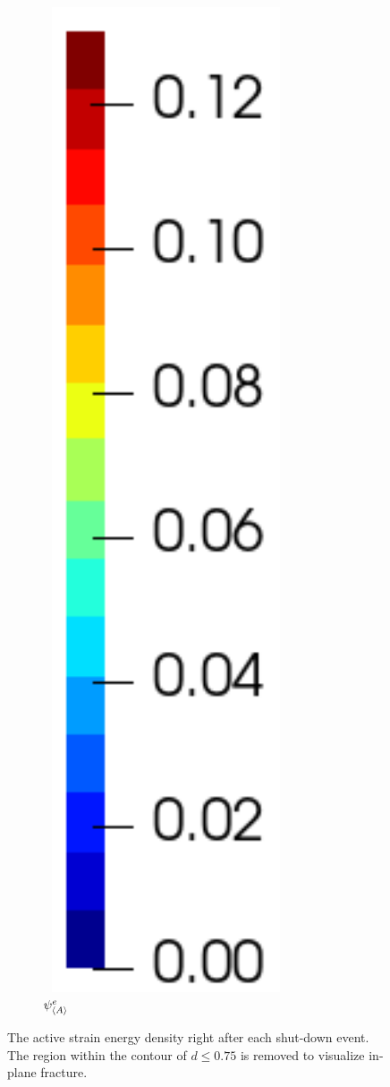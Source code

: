 \begin{figure}[!htb]
\begin{subfigure}{0.08\textwidth}
  \end{subfigure}
  \begin{subfigure}{0.1\textwidth}
    \centering
    \caption*{$\psi^e_{\left< A \right>}$}
    \includegraphics[width=0.8\textwidth]{Chapter5/figures/spallation/colorbar_psie}
  \end{subfigure}
  \caption[The active strain energy density right after each shut-down event.]{The active strain energy density right after each shut-down event. The region within the contour of $d \leqslant 0.75$ is removed to visualize in-plane fracture.}
  \label{fig: Chapter5/spallation/animation_psie}
\end{figure}
